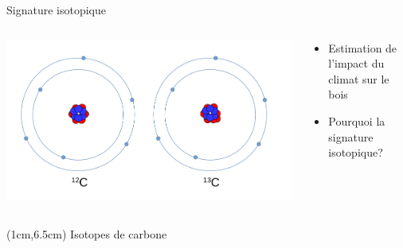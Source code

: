 \documentclass{beamer}
\begin{document}
\begin{frame}{Signature isotopique}
	\begin{columns}
		
		\begin{column}{0.4\textwidth}
			\includegraphics[width=\textwidth]{Isotope}
		\end{column}
		
		\begin{column}{0.6\textwidth}
			\begin{itemize} 
				\item Estimation de l'impact du climat sur le bois\\
				\vspace{0.5cm}
				\item Pourquoi la signature isotopique?\\
			\end{itemize}	
		\end{column}
		
	\end{columns}
			\begin{textblock*}{10cm}(1cm,6.5cm)
				\tiny Isotopes de carbone
			\end{textblock*}

\end{frame}
\end{document}
